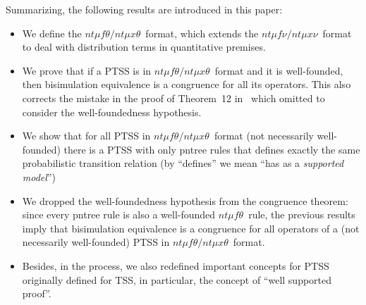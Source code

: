 \documentclass[submission,copyright,creativecommons]{eptcs}
\newcommand{\ntmufnu}{\ensuremath{\textit{nt}\mu\textit{f}\nu}}
\newcommand{\ntmuxnu}{\ensuremath{\textit{nt}\mu\textit{x}\nu}}
\newcommand{\ntmufxnu}{\ensuremath{\ntmufnu\textit{/}\ntmuxnu}}
\newcommand{\ntmuft}{\ensuremath{\textit{nt}\mu\textit{f}\theta}}
\newcommand{\ntmuxt}{\ensuremath{\textit{nt}\mu\textit{x}\theta}}
\newcommand{\ntmufxt}{\ensuremath{\ntmuft\textit{/}\ntmuxt}}
\newcommand{\colorpar}[3]{\colorbox{#1}{\parbox{#2}{#3}}}
\newcommand{\marginremark}[3]{\marginpar{\colorpar{#2}{\linewidth}{\color{#1}#3}}}
\newcommand{\remarkPRD}[1]{\marginremark{darkred}{lightred}{\tiny{[PRD]~ #1}}}
\newcommand{\remarkDG}[1]{\marginremark{darkgreen}{lightyellow}{\tiny{[DG]~ #1}}}
\renewcommand{\remarkDG}[1]{}
\renewcommand{\remarkPRD}[1]{}
\begin{document}
Summarizing, the following results are introduced in this paper:
\begin{itemize}
\item We define the \ntmufxt\ format, which extends the \ntmufxnu\ format
  to deal with distribution terms in quantitative premises.
\item We prove that if a PTSS is in \ntmufxt\ format and it is
  well-founded, then bisimulation equivalence is a congruence for all
  its operators.  This also corrects the mistake in the proof of
  Theorem~12 in~\cite{DL-fossacs12} which omitted to consider the
  well-foundedness hypothesis.
\item We show that for all PTSS in \ntmufxt\ format (not necessarily
  well-founded) there is a PTSS with only pntree rules that defines
  exactly the same probabilistic transition relation (by ``defines'' we
  mean ``has as a \emph{supported model}'')
\item We dropped the well-foundedness hypothesis from the congruence theorem:
  since every pntree rule is also a well-founded \ntmuft\ rule,
  the previous results imply that bisimulation equivalence is a
  congruence for all operators of a (not necessarily
  well-founded) PTSS in \ntmufxt\ format.
\remarkDG{Does statement 4 not states explicitly that `if a PTSS is in \ntmufxt\ format (but not necessarily well-founded), bisimulation equivalence is a congruence for all its operators' - thus make well-foundedness a not necessary precondition? What exactly is in this case the correction?}
\remarkPRD{Actually this is a good point \texttt{:-S}.  Check if the new text is better}
\remarkDG{I believe statements 2 and 4 are still conflicting. Is it not the case that: 1) The proof of bisimilarity is a congruence assumes and works well with the well-foundedness condition. 2) Every PTSS in non well-founded \ntmufxt\  format can be translated to a transition equivalence well-founded PTSS in pntree format 3) Same equiv + pntree are well-founded \ntmufxt\ rules concludes that congruence property is given also for non-well founded PTSS. Do you mean in the beginning of the statement \ntmufxnu\ format which cannot be reduced to a well-founded A\ntmufxnu\ format?}
\remarkPRD{Well, I remove the explanation. There should not be any conflict, now}
\item Besides, in the process, we also redefined important concepts for PTSS
  originally defined for TSS, in particular, the concept of
  ``well supported proof''.
\end{itemize}
\end{document}

